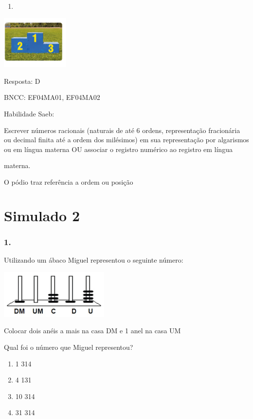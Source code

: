 \begin{enumerate}
\def\labelenumi{\alph{enumi})}
\item
\end{enumerate}

\includegraphics[width=1.33345in,height=1.05843in]{media/image151.png}

Resposta: D

BNCC: EF04MA01, EF04MA02

Habilidade Saeb:

Escrever números racionais (naturais de até 6 ordens, representação
fracionária ou decimal finita até a ordem dos milésimos) em sua
representação por algarismos ou em língua materna OU associar o registro
numérico ao registro em língua

materna.

O pódio traz referência a ordem ou posição

\section{Simulado 2}\label{simulado-2}

\subsubsection{1.}\label{section-157}

Utilizando um ábaco Miguel representou o seguinte número:

\includegraphics[width=2.14744in,height=0.97003in]{media/image152.png}

Colocar dois anéis a mais na casa DM e 1 anel na casa UM

Qual foi o número que Miguel representou?

\begin{enumerate}
\def\labelenumi{\alph{enumi})}
\item
  1 314
\item
  4 131
\item
  10 314
\item
  31 314
\end{enumerate}

